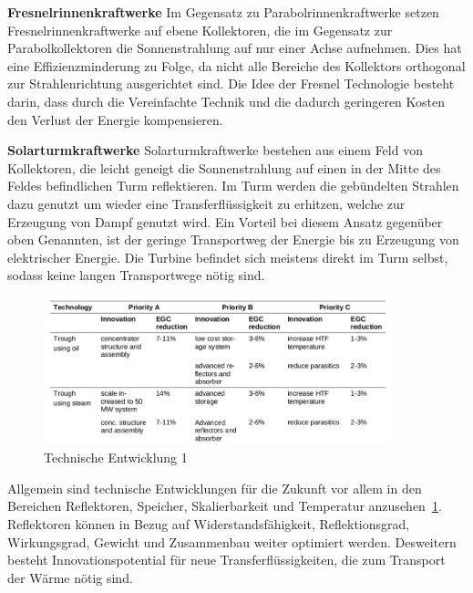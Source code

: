 \textbf{Fresnelrinnenkraftwerke} 
\newline
Im Gegensatz zu Parabolrinnenkraftwerke setzen Fresnelrinnenkraftwerke auf ebene Kollektoren, die im Gegensatz zur Parabolkollektoren die Sonnenstrahlung auf nur einer Achse aufnehmen. Dies hat eine Effizienzminderung zu Folge, da nicht alle Bereiche des Kollektors orthogonal zur Strahlenrichtung ausgerichtet sind. Die Idee der Fresnel Technologie besteht darin, dass durch die Vereinfachte Technik und die dadurch geringeren Kosten den Verlust der Energie kompensieren.

\textbf{Solarturmkraftwerke}
\newline
Solarturmkraftwerke bestehen aus einem Feld von  Kollektoren, die leicht geneigt die Sonnenstrahlung auf einen in der Mitte des Feldes befindlichen Turm reflektieren. Im Turm werden die gebündelten Strahlen dazu genutzt um wieder eine Transferflüssigkeit zu erhitzen, welche zur Erzeugung von Dampf genutzt wird. Ein Vorteil bei diesem Ansatz gegenüber oben Genannten, ist der geringe Transportweg der Energie bis zu Erzeugung von elektrischer Energie. Die Turbine befindet sich meistens direkt im Turm selbst, sodass keine langen Transportwege nötig sind.
\newline

\begin{figure}[H]
	\centering
	\includegraphics[width=0.9\textwidth,trim=1 1 1 1,clip]{technische_entwicklung1.png}
	\caption{Technische Entwicklung 1}
	\label{fig:technik_e1}
\end{figure}

Allgemein sind technische Entwicklungen für die Zukunft vor allem in den Bereichen Reflektoren, Speicher, Skalierbarkeit und Temperatur anzusehen~\ref{fig:technik_e1}.
\newline
Reflektoren können in Bezug auf Widerstandsfähigkeit, Reflektionsgrad, Wirkungsgrad, Gewicht und Zusammenbau weiter optimiert werden. Desweitern besteht Innovationspotential für neue Transferflüssigkeiten, die zum Transport der Wärme nötig sind.

